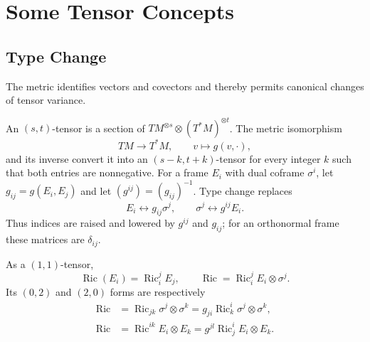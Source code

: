 \section{Some Tensor Concepts}

\subsection{Type Change}

The metric identifies vectors and covectors and thereby permits canonical
changes of tensor variance.

\begin{definition}
  \label{def:pet-ch1-tensor-type-change}


  An $(s,t)$-tensor is a section of
  $TM^{\otimes s}\otimes(T^*M)^{\otimes t}$. The metric isomorphism
  \[
    TM\longrightarrow T^*M,
    \qquad v\longmapsto g(v,\cdot),
  \]
  and its inverse convert it into an $(s-k,t+k)$-tensor for every integer $k$
  such that both entries are nonnegative. For a frame $E_i$ with dual coframe
  $\sigma^i$, let
  $g_{ij}=g(E_i,E_j)$ and let $(g^{ij})=(g_{ij})^{-1}$. Type change replaces
  \[
    E_i\longleftrightarrow g_{ij}\sigma^j,
    \qquad
    \sigma^j\longleftrightarrow g^{ij}E_i.
  \]
  Thus indices are raised and lowered by $g^{ij}$ and $g_{ij}$; for an
  orthonormal frame these matrices are $\delta_{ij}$.
\end{definition}

\begin{notation}
  \label{def:pet-ch1-ricci-types}


  As a $(1,1)$-tensor,
  \[
    \operatorname{Ric}(E_i)=\operatorname{Ric}^j_iE_j,
    \qquad
    \operatorname{Ric}=\operatorname{Ric}^j_iE_i\otimes\sigma^j.
  \]
  Its $(0,2)$ and $(2,0)$ forms are respectively
  \[
  \begin{aligned}
    \operatorname{Ric}
      &=\operatorname{Ric}_{jk}\sigma^j\otimes\sigma^k
        =g_{ji}\operatorname{Ric}^i_k\sigma^j\otimes\sigma^k,\\
    \operatorname{Ric}
      &=\operatorname{Ric}^{ik}E_i\otimes E_k
        =g^{jl}\operatorname{Ric}^i_jE_i\otimes E_k.
  \end{aligned}
  \]
\end{notation}

